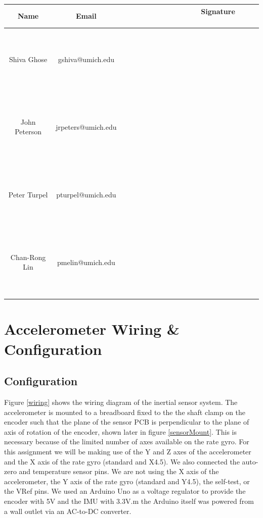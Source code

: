\documentclass{article}
\theoremstyle{plain}
\theoremstyle{definition}
\theoremstyle{remark}
\begin{document}
\begin{table}[h]
\begin{center}
    \begin{tabular}{|c|c|c|}
        \hline
        \textbf{Name} & \textbf{Email}     & \textbf{ \ \ \ \ \  \ \  \ \ \ \ \  \ \ Signature  \ \ \ \ \  \ \ \ \ \ \ \  \ \ } \\ \hline
        	~& ~& ~\\
	~& ~& ~\\
	Shiva Ghose   & gshiva@umich.edu   & ~                  \\
	~& ~& ~\\
	~& ~& ~\\ \hline 
	~& ~& ~\\
	~& ~& ~\\
        John Peterson & jrpeters@umich.edu & ~                  \\ 
	~& ~& ~\\
	~& ~& ~\\ \hline 
	~& ~& ~\\
	~& ~& ~\\
        Peter Turpel   & pturpel@umich.edu & ~                  \\
	~& ~& ~\\
	~& ~& ~\\ \hline 
	~& ~& ~\\
	~& ~& ~\\
        Chan-Rong Lin   & pmelin@umich.edu & ~                  \\
	~& ~& ~\\
	~& ~& ~\\ \hline 
        \hline
    \end{tabular}
\end{center}
\end{table}

\newpage

\section{Accelerometer Wiring \& Configuration} 

\subsection{Configuration}

Figure \ref{wiring} shows the wiring diagram of the inertial sensor system. The accelerometer is mounted to a breadboard fixed to the the shaft clamp on the encoder such that the plane of the sensor PCB is perpendicular to the plane of axis of rotation of the encoder, shown later in figure \ref{sensorMount}.  This is necessary because of the limited number of axes available on the rate gyro.  For this assignment we will be making use of the Y and Z axes of the accelerometer and the X axis of the rate gyro (standard and X4.5). We also connected the auto-zero and temperature sensor pins. We are not using the X axis of the accelerometer, the Y axis of the rate gyro (standard and Y4.5), the self-test, or the VRef pins. We used an Arduino Uno as a voltage regulator to provide the encoder with 5V and the IMU with 3.3V.m the Arduino itself was powered from a wall outlet via an AC-to-DC converter.   \\
\end{document}
